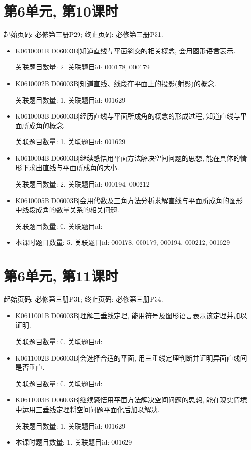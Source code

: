 \section*{第6单元, 第10课时}
起始页码: 必修第三册P29; 终止页码: 必修第三册P31.
\begin{itemize}
\item K0610001B|D06003B|知道直线与平面斜交的相关概念, 会用图形语言表示.

关联题目数量: 2. 关联题目id: 000178, 000179

\item K0610002B|D06003B|知道直线、线段在平面上的投影(射影)的概念.

关联题目数量: 1. 关联题目id: 001629

\item K0610003B|D06003B|经历直线与平面所成角的概念的形成过程, 知道直线与平面所成角的概念.

关联题目数量: 1. 关联题目id: 001629

\item K0610004B|D06003B|继续感悟用平面方法解决空间问题的思想, 能在具体的情形下求出直线与平面所成角的大小.

关联题目数量: 2. 关联题目id: 000194, 000212

\item K0610005B|D06003B|会用代数及三角方法分析求解直线与平面所成角的图形中线段成角的数量关系的相关问题.

关联题目数量: 0. 关联题目id: 

\item 本课时题目数量: 5. 关联题目id: 000178, 000179, 000194, 000212, 001629

\end{itemize}

\section*{第6单元, 第11课时}
起始页码: 必修第三册P31; 终止页码: 必修第三册P34.
\begin{itemize}
\item K0611001B|D06003B|理解三垂线定理, 能用符号及图形语言表示该定理并加以证明.

关联题目数量: 0. 关联题目id: 

\item K0611002B|D06003B|会选择合适的平面, 用三垂线定理判断并证明异面直线间是否垂直.

关联题目数量: 0. 关联题目id: 

\item K0611003B|D06003B|继续感悟用平面方法解决空间问题的思想, 能在现实情境中运用三垂线定理将空间问题平面化后加以解决.

关联题目数量: 1. 关联题目id: 001629

\item 本课时题目数量: 1. 关联题目id: 001629

\end{itemize}


